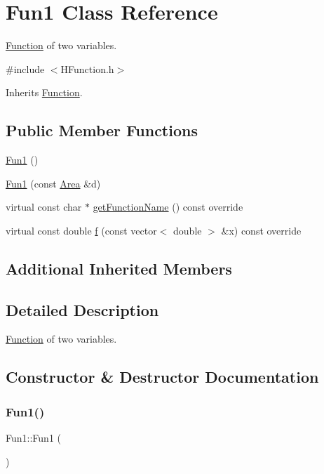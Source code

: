 \hypertarget{class_fun1}{}\section{Fun1 Class Reference}
\label{class_fun1}


\hyperlink{class_function}{Function} of two variables.  




{\ttfamily \#include $<$H\+Function.\+h$>$}



Inherits \hyperlink{class_function}{Function}.

\subsection*{Public Member Functions}
\begin{DoxyCompactItemize}
\item 
\hyperlink{class_fun1_a6fbe8d8272549c14f2999eaa3262e5bf}{Fun1} ()
\item 
\hyperlink{class_fun1_a44d0e471ec78e8ad134680de4bec992b}{Fun1} (const \hyperlink{class_area}{Area} \&d)
\item 
virtual const char $\ast$ \hyperlink{class_fun1_a94ea2bb4448ebe03753de16d07784ea8}{get\+Function\+Name} () const override
\item 
virtual const double \hyperlink{class_fun1_adbd9aa971a649a7b6eda8fb6806a8498}{f} (const vector$<$ double $>$ \&x) const override
\end{DoxyCompactItemize}
\subsection*{Additional Inherited Members}


\subsection{Detailed Description}
\hyperlink{class_function}{Function} of two variables. 

\subsection{Constructor \& Destructor Documentation}
\mbox{\label{class_fun1_a6fbe8d8272549c14f2999eaa3262e5bf}} 
\subsubsection{\texorpdfstring{Fun1()}{Fun1()}\hspace{0.1cm}{\footnotesize\ttfamily [1/2]}}
{\footnotesize\ttfamily Fun1\+::\+Fun1 (\begin{DoxyParamCaption}{ }\end{DoxyParamCaption})}

